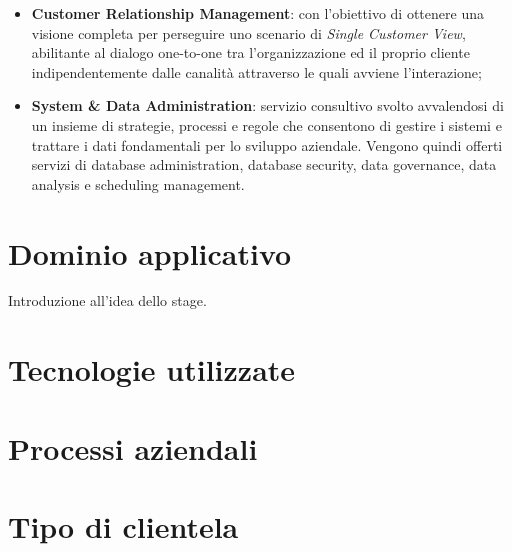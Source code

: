 \begin{itemize}
	\item \textbf{Customer Relationship Management}: con l'obiettivo di ottenere una visione completa per perseguire uno scenario di \textit{Single Customer View}, abilitante al dialogo one-to-one tra l'organizzazione ed il proprio cliente indipendentemente dalle canalità attraverso le quali avviene l'interazione;
	\item \textbf{System \& Data Administration}: servizio consultivo svolto avvalendosi di un insieme di strategie, processi e regole che consentono di gestire i sistemi e trattare i dati fondamentali per lo sviluppo aziendale. Vengono quindi offerti servizi di database administration, database security, data governance, data analysis e scheduling management.
\end{itemize}

\section{Dominio applicativo}

Introduzione all'idea dello stage.

\section{Tecnologie utilizzate}

\section{Processi aziendali}

\section{Tipo di clientela}



